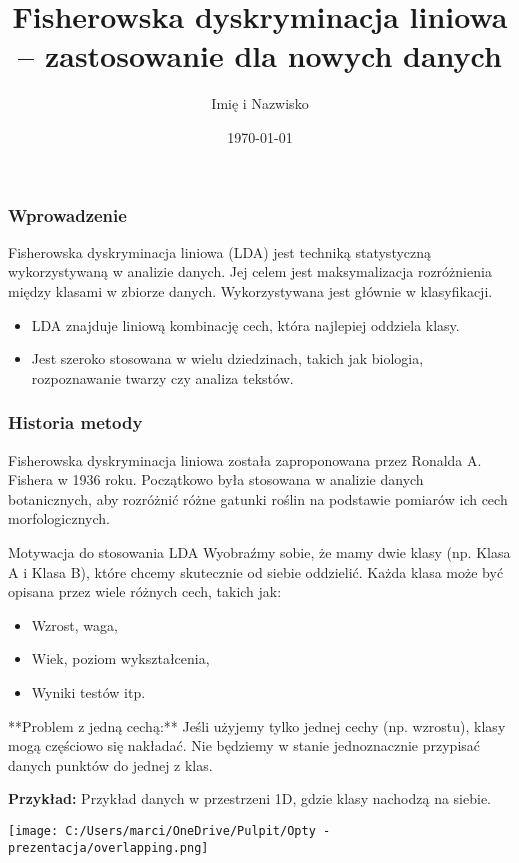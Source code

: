 \documentclass{beamer}
\title{Fisherowska dyskryminacja liniowa – zastosowanie dla nowych danych}
\author{Imię i Nazwisko}
\date{\today}
\begin{document}
\begin{frame}
    \titlepage
\end{frame}

\begin{frame}
    \frametitle{Wprowadzenie}
    Fisherowska dyskryminacja liniowa (LDA) jest techniką statystyczną wykorzystywaną w analizie danych. Jej celem jest maksymalizacja rozróżnienia między klasami w zbiorze danych. Wykorzystywana jest głównie w klasyfikacji.
    \begin{itemize}
        \item LDA znajduje liniową kombinację cech, która najlepiej oddziela klasy.
        \item Jest szeroko stosowana w wielu dziedzinach, takich jak biologia, rozpoznawanie twarzy czy analiza tekstów.
    \end{itemize}
\end{frame}

\begin{frame}
    \frametitle{Historia metody}
    Fisherowska dyskryminacja liniowa została zaproponowana przez Ronalda A. Fishera w 1936 roku. Początkowo była stosowana w analizie danych botanicznych, aby rozróżnić różne gatunki roślin na podstawie pomiarów ich cech morfologicznych.
\end{frame}





\begin{frame}{Motywacja do stosowania LDA}
    Wyobraźmy sobie, że mamy dwie klasy (np. Klasa A i Klasa B), które chcemy skutecznie od siebie oddzielić. Każda klasa może być opisana przez wiele różnych cech, takich jak:
    \begin{itemize}
        \item Wzrost, waga,
        \item Wiek, poziom wykształcenia,
        \item Wyniki testów itp.
    \end{itemize}
    
    \bigskip
    **Problem z jedną cechą:** Jeśli użyjemy tylko jednej cechy (np. wzrostu), klasy mogą częściowo się nakładać. Nie będziemy w stanie jednoznacznie przypisać danych punktów do jednej z klas.

    \bigskip
    \textbf{Przykład:} Przykład danych w przestrzeni 1D, gdzie klasy nachodzą na siebie.
    
    \bigskip
    \texttt{[image: C:/Users/marci/OneDrive/Pulpit/Opty - prezentacja/overlapping.png]} 
\end{frame}
\end{document}
